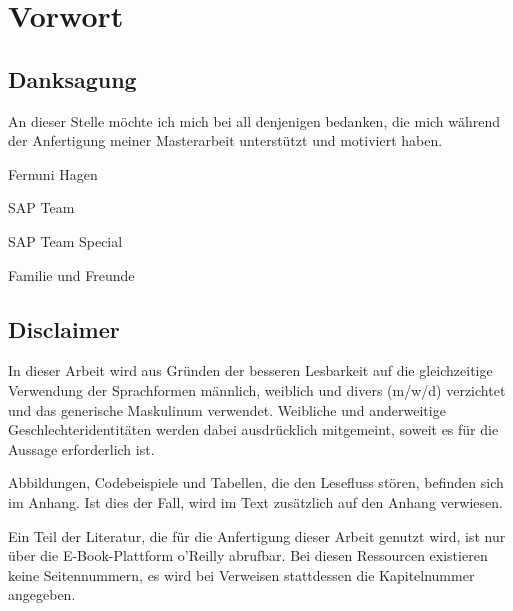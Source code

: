 \chapter*{Vorwort}
\section*{Danksagung}
An dieser Stelle möchte ich mich bei all denjenigen bedanken, die mich während der Anfertigung meiner Masterarbeit unterstützt und motiviert haben.

\vspace{0.25cm}
Fernuni Hagen

\vspace{0.25cm}
SAP Team

\vspace{0.25cm}
SAP Team Special

\vspace{0.25cm}
Familie und Freunde

\section*{Disclaimer}
In dieser Arbeit wird aus Gründen der besseren Lesbarkeit auf die gleichzeitige Verwendung der Sprachformen männlich, weiblich und divers (m/w/d) verzichtet und das generische Maskulinum verwendet. Weibliche und anderweitige Geschlechteridentitäten werden dabei ausdrücklich mitgemeint, soweit es für die Aussage erforderlich ist.

\vspace{0.25cm}
Abbildungen, Codebeispiele und Tabellen, die den Lesefluss stören, befinden sich im Anhang. Ist dies der Fall, wird im Text zusätzlich auf den Anhang verwiesen.

\vspace{0.25cm}
Ein Teil der Literatur, die für die Anfertigung dieser Arbeit genutzt wird, ist nur über die E-Book-Plattform o'Reilly abrufbar. Bei diesen Ressourcen existieren keine Seitennummern, es wird bei Verweisen stattdessen die Kapitelnummer angegeben.